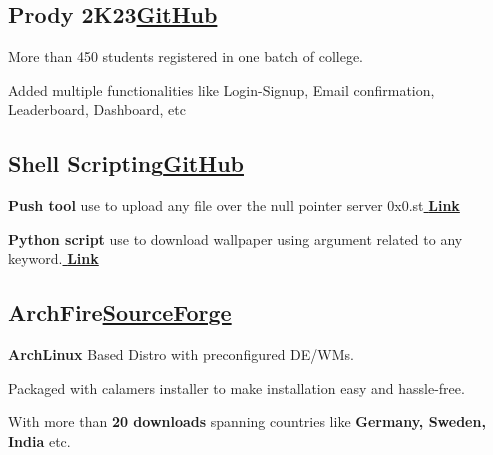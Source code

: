 \documentclass[a4paper,12pt]{article}
\begin{document}

\vspace*{4pt}
\subsection{{Prody 2K23}\hfill \href{https://github.com/istenith/PRODY-2023}{\textbf{GitHub}}} %
\begin{zitemize}
\item More than 450 students registered in one batch of college.
\item Added multiple functionalities like Login-Signup, Email confirmation, Leaderboard, Dashboard, etc
\end{zitemize}

\vspace*{4pt}
\subsection{{Shell Scripting}\hfill \href{https://gist.github.com/lucifer1708}{\textbf{GitHub}}} 
\begin{zitemize}
  \item \textbf{Push tool} use to upload any file over the null pointer server 0x0.st\href{https://gist.github.com/lucifer1708/196a83a11efa5b1b17fd23a79dfb812e}{\textbf{ Link}}
  \item \textbf{Python script} use to download wallpaper using argument related to any keyword.\href{https://gist.github.com/lucifer1708/d46f4f91b1bff345aba25afc1e81f6d6}{\textbf{ Link}}
\end{zitemize}

\vspace*{4pt}
\subsection{{ArchFire}\hfill \href{https://sourceforge.net/projects/archfire/}{\textbf{SourceForge}}} 
\begin{zitemize}
  \item \textbf{ArchLinux} Based Distro with preconfigured DE/WMs.
\item Packaged with calamers installer to make installation easy and hassle-free.
\item With more than \textbf{20 downloads} spanning countries like \textbf{Germany, Sweden, India }etc.
\end{zitemize}
\end{document}
